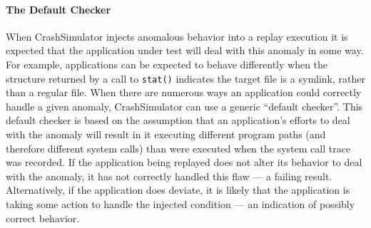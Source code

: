 


    
    \paragraph{The Default Checker}

    When CrashSimulator injects anomalous behavior into a replay execution it is
    expected that the application under test will deal with this
    anomaly in some way. For example, applications
    can be expected to behave differently when
    the structure returned by a call to {\tt stat()} indicates the target file
    is a symlink, rather than a regular file.
    When there are numerous ways an
    application could correctly handle a given anomaly, CrashSimulator 
    can use a generic ``default checker''.  This default checker
    is based on the assumption that an application's efforts to deal with the anomaly
    will result in it executing different program paths (and therefore different
    system calls) than were executed when the system call trace
    was recorded.  If the application being replayed does not
    alter its behavior to deal with the anomaly, it has not
    correctly handled this flaw --- a failing result.  Alternatively, if the
    application does deviate,
    it is likely that the application is taking some action
    to handle the injected condition --- an indication of possibly correct
    behavior.

